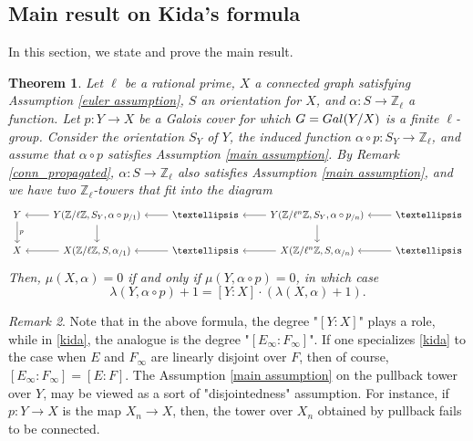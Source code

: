 \documentclass[11pt]{amsart}
\newtheorem{theorem}{Theorem}[section]
\numberwithin{equation}{section}
\theoremstyle{remark}
\newtheorem{remark}[theorem]{Remark}
\begin{document}
\subsection{Main result on Kida's formula} In this section, we state and prove the main result.
\begin{theorem} \label{main}
Let $\ell$ be a rational prime, $X$ a connected graph satisfying Assumption \ref{euler assumption}, $S$ an orientation for $X$, and $\alpha:S \rightarrow \mathbb{Z}_{\ell}$ a function.  Let $p:Y \rightarrow X$ be a Galois cover for which $G= {\rm Gal}(Y/X)$ is a finite $\ell$-group. Consider the orientation $S_{Y}$ of $Y$, the induced function $\alpha \circ p:S_{Y} \rightarrow \mathbb{Z}_{\ell}$, and assume that $\alpha \circ p$ satisfies Assumption \ref{main assumption}.  By Remark \ref{conn_propagated}, $\alpha:S \rightarrow \mathbb{Z}_{\ell}$ also satisfies Assumption \ref{main assumption}, and we have two $\mathbb{Z}_{\ell}$-towers that fit into the diagram  
\begin{equation*}
\begin{tikzcd}
Y \arrow["p",d] & \arrow[l] \arrow[d] Y(\mathbb{Z}/\ell\mathbb{Z},S_{Y},\alpha \circ p_{/1})& \arrow[l] \ldots&\arrow[l]\arrow[d] Y(\mathbb{Z}/\ell^{n}\mathbb{Z},S_{Y},\alpha \circ p_{/n}) & \arrow[l] \ldots \\
X & \arrow[l] X(\mathbb{Z}/\ell\mathbb{Z},S,\alpha_{/1})  &\arrow[l] \ldots &\arrow[l]X(\mathbb{Z}/\ell^{n}\mathbb{Z},S,\alpha_{/n}) & \arrow[l] \ldots
\end{tikzcd}
\end{equation*}
Then, $\mu(X,\alpha) = 0$ if and only if $\mu(Y,\alpha \circ p)=0$, in which case
\begin{equation}\label{main formula}\lambda(Y,\alpha \circ p) + 1 = [Y:X] \cdot (\lambda(X,\alpha) + 1).\end{equation}
\end{theorem}

\begin{remark}
Note that in the above formula, the degree "$[Y:X]$" plays a role, while in \eqref{kida}, the analogue is the degree "$[E_\infty:F_\infty]$". If one specializes \eqref{kida} to the case when $E$ and $F_\infty$ are linearly disjoint over $F$, then of course, $[E_\infty:F_\infty]=[E:F]$. The Assumption \ref{main assumption} on the pullback tower over $Y$, may be viewed as a sort of "disjointedness" assumption. For instance, if $p:Y\rightarrow X$ is the map $X_n\rightarrow X$, then, the tower over $X_n$ obtained by pullback fails to be connected.
\end{remark}
\end{document}
